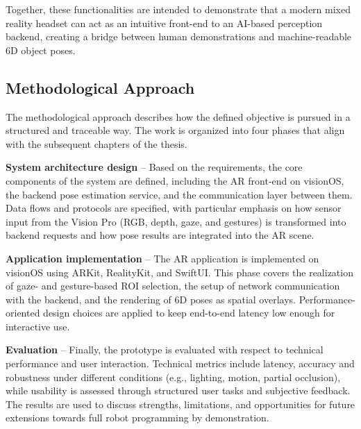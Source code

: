 Together, these functionalities are intended to demonstrate that a modern mixed reality headset can act as an intuitive front-end to an AI-based perception backend, creating a bridge between human demonstrations and machine-readable 6D object poses.

\subsection{Methodological Approach}

The methodological approach describes how the defined objective is pursued in a structured and traceable way. The work is organized into four phases that align with the subsequent chapters of the thesis.


\textbf{System architecture design} – Based on the requirements, the core components of the system are defined, including the AR front-end on visionOS, the backend pose estimation service, and the communication layer between them. Data flows and protocols are specified, with particular emphasis on how sensor input from the Vision Pro (RGB, depth, gaze, and gestures) is transformed into backend requests and how pose results are integrated into the AR scene.

\textbf{Application implementation} – The AR application is implemented on visionOS using ARKit, RealityKit, and SwiftUI. This phase covers the realization of gaze- and gesture-based ROI selection, the setup of network communication with the backend, and the rendering of 6D poses as spatial overlays. Performance-oriented design choices are applied to keep end-to-end latency low enough for interactive use.

\textbf{Evaluation} – Finally, the prototype is evaluated with respect to technical performance and user interaction. Technical metrics include latency, accuracy and robustness under different conditions (e.g., lighting, motion, partial occlusion), while usability is assessed through structured user tasks and subjective feedback. The results are used to discuss strengths, limitations, and opportunities for future extensions towards full robot programming by demonstration.
